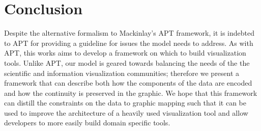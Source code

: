 \documentclass[../main.tex]{subfiles}
\begin{document}
\section{Conclusion}
Despite the alternative formalism to Mackinlay's APT framework, it is indebted to APT for providing a guideline for issues the model needs to address. As with APT, this works aims to develop a framework on which to build visualization tools. Unlike APT, our model is geared towards balancing the needs of the the scientific and information visualization communities; therefore we present a framework that can describe both how the components of the data are encoded and how the continuity is preserved in the graphic. We hope that this framework can distill the constraints on the data to graphic mapping such that it can be used to improve the architecture of a heavily used visualization tool and allow developers to more easily build domain specific tools. 
\end{document}
